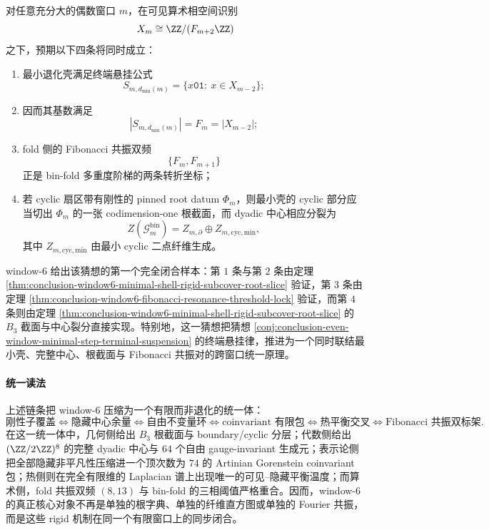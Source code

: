 \begin{conjecture}\label{conj:conclusion-even-window-subcover-center-resonance-lock}
对任意充分大的偶数窗口 \(m\)，在可见算术相空间识别
\[
X_m\cong \ZZ/(F_{m+2}\ZZ)
\]
之下，预期以下四条将同时成立：
\begin{enumerate}
  \item 最小退化壳满足终端悬挂公式
  \[
  S_{m,d_{\min}(m)}
  =
  \{x\mathtt{01}:\ x\in X_{m-2}\};
  \]
  \item 因而其基数满足
  \[
  |S_{m,d_{\min}(m)}|=F_m=|X_{m-2}|;
  \]
  \item fold 侧的 Fibonacci 共振双频
  \[
  \{F_m,F_{m+1}\}
  \]
  正是 bin-fold 多重度阶梯的两条转折坐标；
  \item 若 cyclic 扇区带有刚性的 pinned root datum \(\Phi_m\)，则最小壳的 cyclic 部分应当切出 \(\Phi_m\) 的一张 codimension-one 根截面，而 dyadic 中心相应分裂为
  \[
  Z(\mathcal G_m^{\mathrm{bin}})
  =
  Z_{m,\partial}\oplus Z_{m,\mathrm{cyc,min}},
  \]
  其中 \(Z_{m,\mathrm{cyc,min}}\) 由最小 cyclic 二点纤维生成。
\end{enumerate}
window-\(6\) 给出该猜想的第一个完全闭合样本：第 \(1\) 条与第 \(2\) 条由定理 \ref{thm:conclusion-window6-minimal-shell-rigid-subcover-root-slice} 验证，第 \(3\) 条由定理 \ref{thm:conclusion-window6-fibonacci-resonance-threshold-lock} 验证，而第 \(4\) 条则由定理 \ref{thm:conclusion-window6-minimal-shell-rigid-subcover-root-slice} 的 \(B_3\) 截面与中心裂分直接实现。特别地，这一猜想把猜想 \ref{conj:conclusion-even-window-minimal-step-terminal-suspension} 的终端悬挂律，推进为一个同时联结最小壳、完整中心、根截面与 Fibonacci 共振对的跨窗口统一原理。
\end{conjecture}

\paragraph{统一读法}
上述链条把 window-\(6\) 压缩为一个有限而非退化的统一体：
\[
\text{刚性子覆盖}
\Longleftrightarrow
\text{隐藏中心余量}
\Longleftrightarrow
\text{自由不变量环}
\Longleftrightarrow
\text{coinvariant 有限包}
\Longleftrightarrow
\text{热平衡交叉}
\Longleftrightarrow
\text{Fibonacci 共振双标架}.
\]
在这一统一体中，几何侧给出 \(B_3\) 根截面与 boundary/cyclic 分层；代数侧给出
\((\ZZ/2\ZZ)^8\) 的完整 dyadic 中心与 \(64\) 个自由 gauge-invariant 生成元；表示论侧把全部隐藏非平凡性压缩进一个顶次数为 \(74\) 的 Artinian Gorenstein coinvariant 包；热侧则在完全有限维的 Laplacian 谱上出现唯一的可见--隐藏平衡温度；而算术侧，fold 共振双频 \((8,13)\) 与 bin-fold 的三相阈值严格重合。因而，window-\(6\) 的真正核心对象不再是单独的根字典、单独的纤维直方图或单独的 Fourier 共振，而是这些 rigid 机制在同一个有限窗口上的同步闭合。

\endinput

